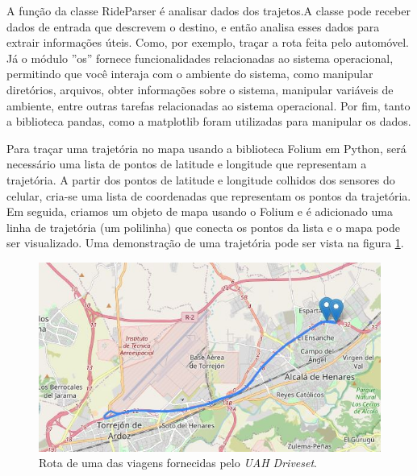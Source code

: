 
A função da classe RideParser é analisar dados dos trajetos.A classe pode receber dados de entrada que descrevem o destino, e então analisa esses dados para extrair informações úteis. Como, por exemplo, traçar a rota feita pelo automóvel. Já o módulo 
''os'' fornece funcionalidades relacionadas ao sistema operacional, permitindo que você interaja com o ambiente do sistema, como manipular diretórios, arquivos, obter informações sobre o sistema, manipular variáveis de ambiente, entre outras tarefas relacionadas ao sistema operacional.
Por fim, tanto a biblioteca pandas, como a matplotlib foram utilizadas para manipular os dados.

Para traçar uma trajetória no mapa usando a biblioteca Folium em Python, será necessário uma lista de pontos de latitude e longitude que representam a trajetória. A partir dos pontos de latitude e longitude colhidos dos sensores do celular, cria-se uma lista de coordenadas que representam os pontos da trajetória. Em seguida, criamos um objeto de mapa usando o Folium e é adicionado uma linha de trajetória (um polilinha) que conecta os pontos da lista e o mapa pode ser visualizado. Uma demonstração de uma trajetória pode ser vista na figura \ref{fig:car_route_1}.

\begin{figure}[hp]
    \centering
    
    \includegraphics[scale=0.8]{figures/rota_1.jpg}
    
    \caption{Rota de uma das viagens fornecidas pelo \textit{UAH Driveset}.}
    
    \label{fig:car_route_1}
\end{figure}

